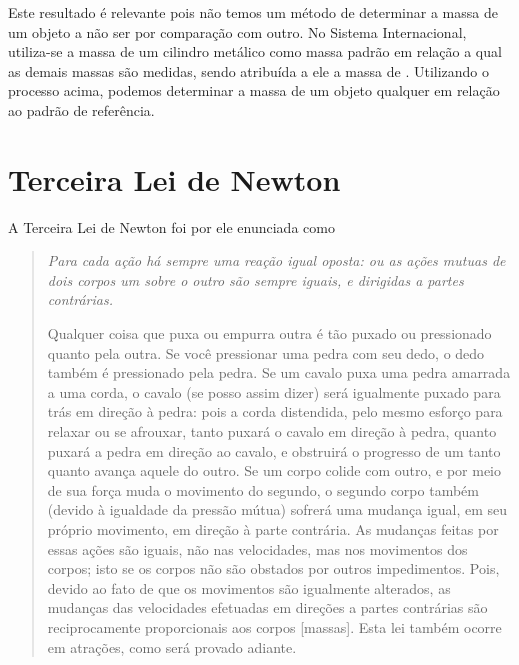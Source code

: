 Este resultado é relevante pois não temos um método de determinar a massa de um objeto a não ser por comparação com outro. No Sistema Internacional, utiliza-se a massa de um cilindro metálico como massa padrão em relação a qual as demais massas são medidas, sendo atribuída a ele a massa de . Utilizando o processo acima, podemos determinar a massa de um objeto qualquer em relação ao padrão de referência.

\section{Terceira Lei de Newton}

A Terceira Lei de Newton foi por ele enunciada como
\begin{quote}
\emph{Para cada ação há sempre uma reação igual oposta: ou as ações mutuas de dois corpos um sobre o outro são sempre iguais, e dirigidas a partes contrárias.}

Qualquer coisa que puxa ou empurra outra é tão puxado ou pressionado quanto pela outra. Se você pressionar uma pedra com seu dedo, o dedo também é pressionado pela pedra. Se um cavalo puxa uma pedra amarrada a uma corda, o cavalo (se posso assim dizer) será igualmente puxado para trás em direção à pedra: pois a corda distendida, pelo mesmo esforço para relaxar ou se afrouxar, tanto puxará o cavalo em direção à pedra, quanto puxará a pedra em direção ao cavalo, e obstruirá o progresso de um tanto quanto avança aquele do outro. Se um corpo colide com outro, e por meio de sua força muda o movimento do segundo, o segundo corpo também (devido à igualdade da pressão mútua) sofrerá uma mudança igual, em seu próprio movimento, em direção à parte contrária. As mudanças feitas por essas ações são iguais, não nas velocidades, mas nos movimentos dos corpos; isto se os corpos não são obstados por outros impedimentos. Pois, devido ao fato de que os movimentos são igualmente alterados, as mudanças das velocidades efetuadas em direções a partes contrárias são reciprocamente proporcionais aos corpos [massas]. Esta lei também ocorre em atrações, como será provado adiante.
\end{quote}

